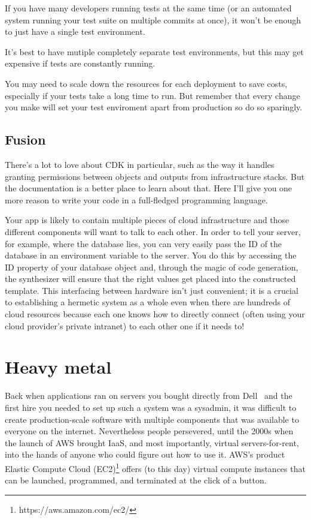 \documentclass{article}
\newcommand{\infobox}[2]{
  \begin{tcolorbox}[width=\textwidth,colback={white},title={\strut\textbf{#1}},colbacktitle=blue!15,coltitle=black,boxrule=0.2pt,parbox=false]
    #2
  \end{tcolorbox}
}
\begin{document}
\infobox{More on remote tests}{
  If you have many developers running tests at the same time (or an automated system running your test suite on multiple commits at once), it won't be enough to just have a single test environment.

  It's best to have mutiple completely separate test environments, but this may get expensive if tests are constantly running.

  You may need to scale down the resources for each deployment to save costs, especially if your tests take a long time to run.
  But remember that every change you make will set your test enviroment apart from production so do so sparingly.
}

\subsection{Fusion}

There's a lot to love about CDK in particular, such as the way it handles granting permissions between objects and outputs from infrastructure stacks.
But the documentation is a better place to learn about that.
Here I'll give you one more reason to write your code in a full-fledged programming language.

Your app is likely to contain multiple pieces of cloud infrastructure and those different components will want to talk to each other.
In order to tell your server, for example, where the database lies, you can very easily pass the ID of the database in an environment variable to the server.
You do this by accessing the ID property of your database object and, through the magic of code generation, the synthesizer will ensure that the right values get placed into the constructed template.
This interfacing between hardware isn't just convenient; it is a crucial to establishing a hermetic system as a whole even when there are hundreds of cloud resources because each one knows how to directly connect (often using your cloud provider's private intranet) to each other one if it needs to!

\section{Heavy metal}

Back when applications ran on servers you bought directly from Dell~\cite{joel-dell} and the first hire you needed to set up such a system was a sysadmin, it was difficult to create production-scale software with multiple components that was available to everyone on the internet.
Nevertheless people persevered, until the 2000s when the launch of AWS brought IaaS, and most importantly, virtual servers-for-rent, into the hands of anyone who could figure out how to use it.
AWS's product Elastic Compute Cloud (EC2)\footnote{https://aws.amazon.com/ec2/} offers (to this day) virtual compute instances that can be launched, programmed, and terminated at the click of a button.
\end{document}
